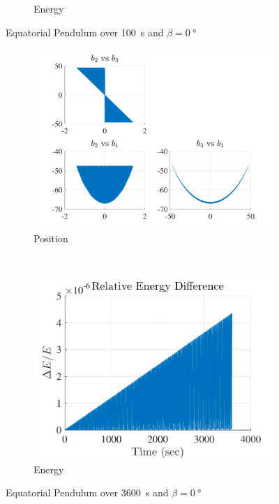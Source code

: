 \documentclass[11pt, reqno]{article}   	%
\begin{document}
\begin{figure}[htbp]
\begin{subfigure}[htbp]{0.5\textwidth}
        \caption{Energy } \label{fig:eq_energy_short} 
    \end{subfigure}
    \caption{Equatorial Pendulum over \SI{100}{s} and \( \beta = \SI{0}{\degree} \)}
    \label{fig:eq_pendulum_short} 
\end{figure}

\begin{figure}[htbp] 
    \centering 
    \begin{subfigure}[htbp]{0.5\textwidth} 
        \includegraphics[width=\textwidth]{figures/eq_position.pdf} 
        \caption{Position } \label{fig:eq_pos} 
    \end{subfigure}~ %
    \begin{subfigure}[htbp]{0.5\textwidth} 
        \includegraphics[width=\textwidth]{figures/eq_energy.pdf} 
        \caption{Energy } \label{fig:eq_energy}
    \end{subfigure}
    \caption{Equatorial Pendulum over \SI{3600}{s} and \( \beta = \SI{0}{\degree} \)}
    \label{fig:eq_pendulum} 
\end{figure}
\end{document}
